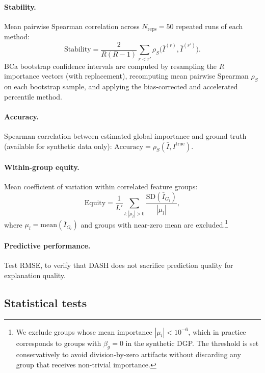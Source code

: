 \documentclass[11pt]{article}
\newcommand{\dash}{\textsc{DASH}}
\begin{document}
\paragraph{Stability.}
Mean pairwise Spearman correlation across $N_{\text{reps}} = 50$ repeated
runs of each method:
\begin{equation}
  \text{Stability} = \frac{2}{R(R-1)} \sum_{r<r'} \rho_S\bigl(
    \bar{I}^{(r)}, \bar{I}^{(r')}\bigr).
\end{equation}
BCa bootstrap confidence intervals are computed by resampling the $R$
importance vectors (with replacement), recomputing mean pairwise
Spearman $\rho_S$ on each bootstrap sample, and applying the
bias-corrected and accelerated percentile method.

\paragraph{Accuracy.}
Spearman correlation between estimated global importance and ground truth
(available for synthetic data only):
$\text{Accuracy} = \rho_S(\bar{I}, I^{\text{true}})$.

\paragraph{Within-group equity.}
Mean coefficient of variation within correlated feature groups:
\begin{equation}
  \text{Equity} = \frac{1}{L'} \sum_{l : |\mu_l| > 0}
    \frac{\text{SD}(\bar{I}_{G_l})}{|\mu_l|},
\end{equation}
where $\mu_l = \text{mean}(\bar{I}_{G_l})$ and groups with near-zero
mean are excluded.\footnote{We exclude groups whose mean importance
$|\mu_l| < 10^{-6}$, which in practice corresponds to groups with
$\beta_g = 0$ in the synthetic DGP. The threshold is set conservatively
to avoid division-by-zero artifacts without discarding any group that
receives non-trivial importance.}

\paragraph{Predictive performance.}
Test RMSE, to verify that \dash{} does not sacrifice prediction quality
for explanation quality.

\subsection{Statistical tests}
\end{document}
